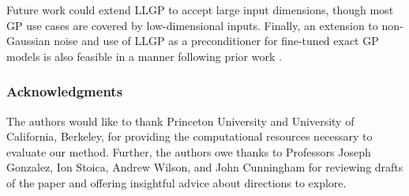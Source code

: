 \documentclass[twoside]{article}
\newif\ifanonymized
\begin{document}
Future work could extend LLGP to accept large input dimensions, though most GP use cases are covered by low-dimensional inputs. Finally, an extension to non-Gaussian noise and use of LLGP as a preconditioner for fine-tuned exact GP models is also feasible in a manner following prior work \citep{cutajar2016preconditioning}.

\pagebreak
\ifanonymized

\else
\subsubsection*{Acknowledgments}
The authors would like to thank Princeton University and University of California, Berkeley, for providing the computational resources necessary to evaluate our method. Further, the authors owe thanks to Professors Joseph Gonzalez, Ion Stoica, Andrew Wilson, and John Cunningham for reviewing drafts of the paper and offering insightful advice about directions to explore.
\fi



\end{document}
